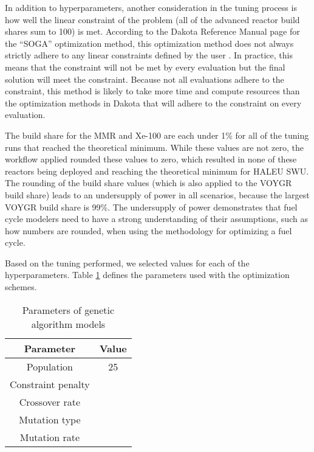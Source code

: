 In addition to hyperparameters, another consideration in the tuning process 
is how well the linear constraint of the problem (all of the advanced 
reactor build shares sum to 100) is met. According to the Dakota 
Reference Manual page for the ``SOGA'' optimization method, this 
optimization method does not always strictly adhere to any linear 
constraints defined by the user \cite{adams_dakota_2019}. In practice, 
this means that the constraint will not be met by every evaluation but the 
final solution will meet the constraint. Because not all evaluations 
adhere to the constraint, this method is likely to take more time and 
compute resources than the optimization methods in Dakota that will 
adhere to the constraint on every evaluation. 

The build share for the \gls{MMR} and Xe-100 are each under 1\% for all of 
the tuning runs that reached the theoretical minimum. While these values 
are not zero, the workflow applied rounded these values to zero, which resulted 
in none of these reactors being deployed and reaching the theoretical 
minimum for \gls{HALEU} {SWU}. The rounding of the build share values (which 
is also applied to the VOYGR build share) leads to an undersupply of 
power in all scenarios, because the largest VOYGR build share is 99\%. 
The undersupply of power demonstrates that fuel cycle modelers need to have 
a strong understanding of their assumptions, such as how numbers are rounded, 
when using the methodology for optimizing a fuel cycle. 


Based on the tuning performed, we selected values for each of the 
hyperparameters. Table \ref{tab:ga_parameters} defines the 
parameters used with the optimization schemes.

\begin{table}
    \centering
    \caption{Parameters of genetic algorithm models}
    \label{tab:ga_parameters}
    \begin{tabular}{c c}
        \hline
        Parameter & Value \\
        \hline
        Population & 25 \\
        Constraint penalty & \\
        Crossover rate & \\
        Mutation type & \\
        Mutation rate & \\
        \hline
        
    \end{tabular}
\end{table}

